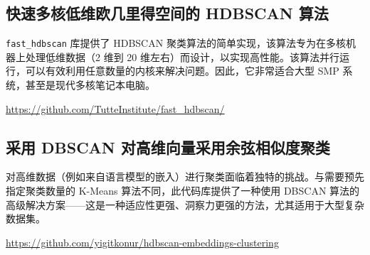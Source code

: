 \begin{lstlisting}[style=python]

\end{lstlisting}

\subsection{快速多核低维欧几里得空间的 HDBSCAN 算法}

\begin{definition}
    \verb`fast_hdbscan` 库提供了 HDBSCAN 聚类算法的简单实现，该算法专为在多核机器上处理低维数据（2 维到 20 维左右）而设计，以实现高性能。该算法并行运行，可以有效利用任意数量的内核来解决问题。因此，它非常适合大型 SMP 系统，甚至是现代多核笔记本电脑。

    \begin{tips}
        \href{https://github.com/TutteInstitute/fast_hdbscan/}{https://github.com/TutteInstitute/fast\_hdbscan/}
    \end{tips}
\end{definition}

\subsection{采用 DBSCAN 对高维向量采用余弦相似度聚类}

\begin{definition}
    对高维数据（例如来自语言模型的嵌入）进行聚类面临着独特的挑战。与需要预先指定聚类数量的 K-Means 算法不同，此代码库提供了一种使用 DBSCAN 算法的高级解决方案——这是一种适应性更强、洞察力更强的方法，尤其适用于大型复杂数据集。
\end{definition}

\begin{tips}
    \href{https://github.com/yigitkonur/hdbscan-embeddings-clustering}{https://github.com/yigitkonur/hdbscan-embeddings-clustering}
\end{tips}


